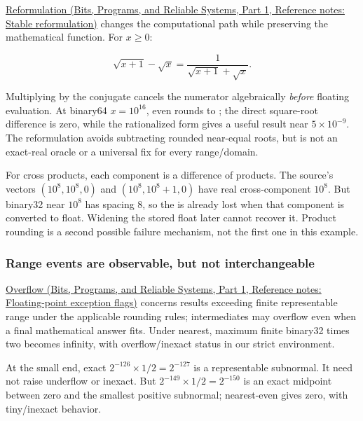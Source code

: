 \href{../01-Bits-Programs-and-Reliable-Systems-P01/main.pdf\#appendix-d7f8ba961670}{Reformulation (Bits, Programs, and Reliable Systems, Part 1, Reference notes: Stable reformulation)} changes the computational path while preserving the mathematical function. For \(x\ge0\):

\[
\sqrt{x+1}-\sqrt{x}
=\frac{1}{\sqrt{x+1}+\sqrt{x}}.
\]

Multiplying by the conjugate cancels the numerator algebraically \emph{before} floating evaluation. At binary64 \(x=10^{16}\), even  rounds to ; the direct square-root difference is zero, while the rationalized form gives a useful result near \(5\times10^{-9}\). The reformulation avoids subtracting rounded near-equal roots, but is not an exact-real oracle or a universal fix for every range/domain.

For cross products, each component is a difference of products. The source's vectors \((10^8,10^8,0)\) and \((10^8,10^8+1,0)\) have real cross-component \(10^8\). But binary32 near \(10^8\) has spacing 8, so the  is already lost when that component is converted to float. Widening the stored float later cannot recover it. Product rounding is a second possible failure mechanism, not the first one in this example.

\subsubsection{Range events are observable, but not interchangeable}\label{05-engine-i-ch001-range-events-are-observable-but-not-interchangeable}

\hypertarget{05-engine-i-ch001-range-events-are-observable-but-not-interchangeable}{}

\href{../01-Bits-Programs-and-Reliable-Systems-P01/main.pdf\#appendix-ed8531b46754}{Overflow (Bits, Programs, and Reliable Systems, Part 1, Reference notes: Floating-point exception flags)} concerns results exceeding finite representable range under the applicable rounding rules; intermediates may overflow even when a final mathematical answer fits. Under nearest, maximum finite binary32 times two becomes infinity, with overflow/inexact status in our strict environment.

At the small end, exact \(2^{-126}\times1/2=2^{-127}\) is a representable subnormal. It need not raise underflow or inexact. But \(2^{-149}\times1/2=2^{-150}\) is an exact midpoint between zero and the smallest positive subnormal; nearest-even gives zero, with tiny/inexact behavior.

